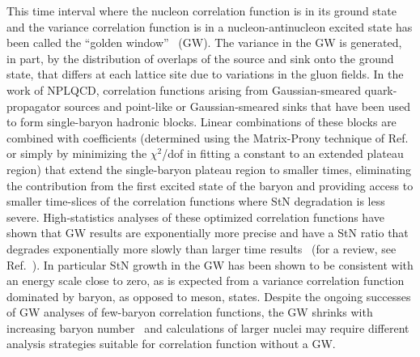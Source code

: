 This time interval where the nucleon correlation function is in its ground state and the variance correlation function is in a nucleon-antinucleon excited state has been called the ``golden window''~\cite{Beane:2009kya} (GW).
The variance in the GW is generated, in part, by the distribution of overlaps of the source and sink onto the ground state, that differs at each lattice site due to variations in the gluon fields.
In the work of NPLQCD, correlation functions arising from Gaussian-smeared quark-propagator sources and point-like or Gaussian-smeared sinks
that have been used to form single-baryon hadronic blocks.  
Linear combinations of these blocks are 
combined with coefficients 
(determined using the Matrix-Prony technique of Ref.~\cite{Beane:2009kya} or simply by minimizing the 
$\chi^2$/dof in fitting a constant to an extended plateau region)
that
extend the single-baryon plateau region to smaller times, eliminating the contribution from the first excited state of the baryon
and providing access to smaller time-slices of the correlation functions where StN degradation is less severe.
High-statistics analyses of these optimized correlation functions have shown that GW results are exponentially more precise
and have a StN ratio that degrades exponentially more slowly than larger time results~\cite{Beane:2009kya,Beane:2009gs,Beane:2009py} (for a review, see Ref.~\cite{Beane:2010em}).
In particular StN growth in the GW has been shown to be consistent with an energy scale close to zero,
 as is expected from a variance correlation function dominated by baryon, as opposed to meson, states.
Despite the ongoing successes of GW analyses of few-baryon correlation functions,
the GW shrinks with increasing baryon number~\cite{Beane:2009kya,Beane:2009gs,Beane:2009py}
and calculations of larger nuclei may require different analysis strategies suitable for correlation function without a GW.


